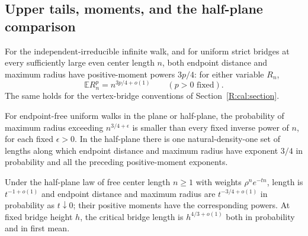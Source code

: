 \subsection{Upper tails, moments, and the half-plane comparison}
\label{R:cal:consequences}
\begin{theorem}\label{R:cal:halfplane-laws}
For the independent-irreducible infinite walk, and for uniform strict
bridges at every sufficiently large even center length $n$, both endpoint
distance and maximum radius have positive-moment powers $3p/4$: for either
variable $R_n$,
\[
 \mathbb E R_n^p=n^{3p/4+o(1)}\qquad(p>0\text{ fixed}).
\]
The same holds for the vertex-bridge conventions of
Section~\ref{R:cal:section}.

For endpoint-free uniform walks in the plane or half-plane, the probability
of maximum radius exceeding $n^{3/4+\epsilon}$ is smaller than every fixed
inverse power of $n$, for each fixed $\epsilon>0$. In the half-plane there
is one natural-density-one set of lengths along which endpoint distance and
maximum radius have exponent $3/4$ in probability and all the preceding
positive-moment exponents.

Under the half-plane law of free center length $n\ge1$ with weights
$\rho^n e^{-tn}$, length is $t^{-1+o(1)}$ and endpoint distance and maximum
radius are $t^{-3/4+o(1)}$ in probability as $t\downarrow0$; their positive
moments have the corresponding powers. At fixed bridge height $h$, the
critical bridge length is $h^{4/3+o(1)}$ both in probability and in first
mean.
\end{theorem}
